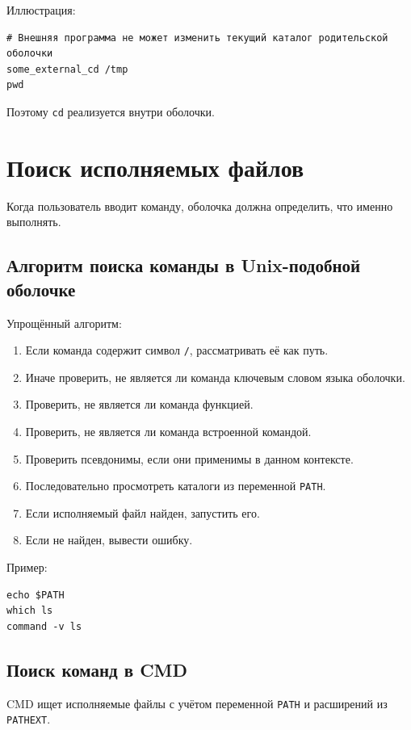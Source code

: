 \documentclass[12pt,a4paper]{article}
\begin{document}
Иллюстрация:

\begin{lstlisting}
# Внешняя программа не может изменить текущий каталог родительской оболочки
some_external_cd /tmp
pwd
\end{lstlisting}

Поэтому \texttt{cd} реализуется внутри оболочки.

\section{Поиск исполняемых файлов}

Когда пользователь вводит команду, оболочка должна определить, что именно выполнять.

\subsection{Алгоритм поиска команды в Unix-подобной оболочке}

Упрощённый алгоритм:
\begin{enumerate}
    \item Если команда содержит символ \texttt{/}, рассматривать её как путь.
    \item Иначе проверить, не является ли команда ключевым словом языка оболочки.
    \item Проверить, не является ли команда функцией.
    \item Проверить, не является ли команда встроенной командой.
    \item Проверить псевдонимы, если они применимы в данном контексте.
    \item Последовательно просмотреть каталоги из переменной \texttt{PATH}.
    \item Если исполняемый файл найден, запустить его.
    \item Если не найден, вывести ошибку.
\end{enumerate}

Пример:

\begin{lstlisting}
echo $PATH
which ls
command -v ls
\end{lstlisting}

\subsection{Поиск команд в CMD}

CMD ищет исполняемые файлы с учётом переменной \texttt{PATH} и расширений из \texttt{PATHEXT}.
\end{document}
